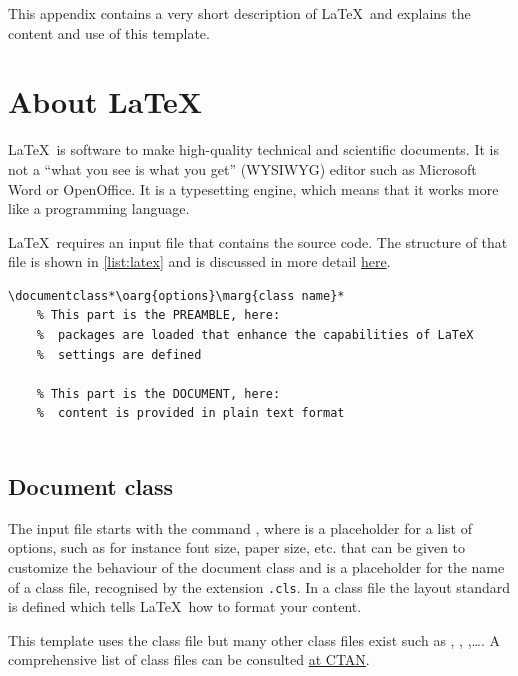\label{ch:about}
This appendix contains a very short description of \LaTeX\ and explains the content and use of this template.

\section{About \LaTeX}\label{sec:aboutlatex}
\LaTeX\ is software to make high-quality technical and scientific documents. It is not a \enquote{what you see is what you get} (WYSIWYG) editor such as Microsoft Word or OpenOffice. It is a typesetting engine, which means that it works more like a programming language.

\LaTeX\ requires an input file that contains the source code. The structure of that file is shown in \cref{list:latex} and is discussed in more detail \href{https://en.wikibooks.org/wiki/LaTeX/Document_Structure}{here}.

\begin{lstlisting}[language=latexcode,style=latexstyle,label={list:latex},caption={Structure of a LaTeX file}]
 \documentclass*\oarg{options}\marg{class name}*
    % This part is the PREAMBLE, here:
    %  packages are loaded that enhance the capabilities of LaTeX
    %  settings are defined
 
    % This part is the DOCUMENT, here:
    %  content is provided in plain text format
 
\end{lstlisting}

\subsection{Document class}
The input file starts with the command , where  is a placeholder for a list of options, such as for instance font size, paper size, etc. that can be given to customize the behaviour of the document class and  is a placeholder for the name of a class file, recognised by the extension \texttt{.cls}. In a class file the layout standard is defined which tells \LaTeX\ how to format your content. 

This template uses the class file  but many other class files exist such as , , ,\dots. A comprehensive list of class files can be consulted \href{https://ctan.org/topic/class}{at CTAN}.


